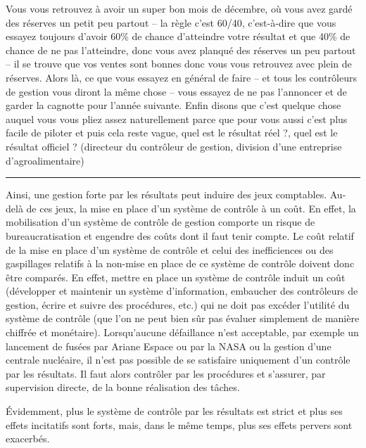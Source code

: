 \documentclass[oneside]{kaobook}
\begin{document}
Vous vous retrouvez à avoir un super bon mois de décembre, où vous  avez gardé des réserves un petit peu partout – la règle c’est 60/40, c’est-à-dire que vous essayez toujours d’avoir 60\% de chance d’atteindre votre résultat et que 40\% de chance de ne pas l’atteindre, donc vous avez planqué des réserves un peu partout – il se trouve que vos ventes sont bonnes donc vous vous retrouvez avec plein de réserves. Alors là, ce que vous essayez en général de faire – et tous les contrôleurs de gestion vous diront la même chose – vous essayez de ne pas l’annoncer et de garder la cagnotte pour l’année suivante. Enfin disons que c’est quelque chose auquel vous vous pliez assez naturellement parce que pour vous aussi c’est plus facile de piloter et puis cela reste vague, quel est le résultat réel ?, quel est le résultat officiel ? (directeur du contrôleur de gestion, division d’une entreprise d’agroalimentaire)

\noindent\rule{\textwidth}{0.5pt}

Ainsi, une gestion forte par les résultats peut induire des jeux comptables. Au-delà de ces jeux, la mise en place d’un système de contrôle à un coût. En effet, la mobilisation d’un système de contrôle de gestion comporte un risque de bureaucratisation et engendre des coûts dont il faut tenir compte. Le coût relatif de la mise en place d’un système de contrôle et celui des inefficiences ou des gaspillages relatifs à la non-mise en place de ce système de contrôle doivent donc être comparés. En effet, mettre en place un système de contrôle induit un coût (développer et maintenir un système d’information, embaucher des contrôleurs de gestion, écrire et suivre des procédures, etc.) qui ne doit pas excéder l’utilité du système de contrôle (que l’on ne peut bien sûr pas évaluer simplement de manière chiffrée et monétaire). Lorsqu’aucune défaillance n’est acceptable, par exemple un lancement de fusées par Ariane Espace ou par la NASA ou la gestion d’une centrale nucléaire, il n’est pas possible de se satisfaire uniquement d’un contrôle par les résultats. Il faut alors contrôler par les procédures et s’assurer, par supervision directe, de la bonne réalisation des tâches.

Évidemment, plus le système de contrôle par les résultats est strict et plus ses effets incitatifs sont forts, mais, dans le même temps, plus ses effets pervers sont exacerbés.
\end{document}
